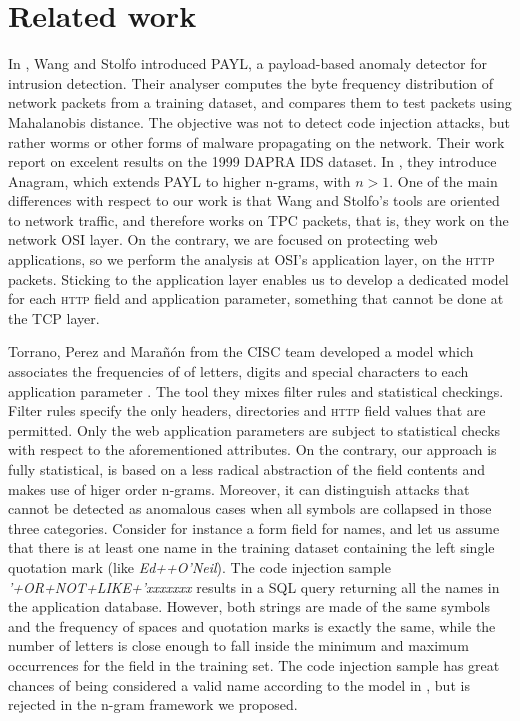 \documentclass[runningheads,a4paper]{llncs}
\newcommand{\HTTP}{\textsc{http}\xspace}
\begin{document}
\section{Related work}

In \cite{wang2004anomalous}, Wang and Stolfo introduced PAYL, a payload-based anomaly detector for intrusion detection. Their analyser computes the byte frequency distribution of network packets from a training dataset, and compares them to test packets using Mahalanobis distance. The objective was not to detect code injection attacks, but rather worms or other forms of malware propagating on the network. Their work report on excelent results on the 1999 DAPRA IDS dataset. In \cite{wang2006anagram}, they introduce Anagram, which extends PAYL to higher n-grams, with $n>1$. One of the main differences with respect to our work is that Wang and Stolfo's tools are oriented to network traffic, and therefore works on TPC packets, that is, they work on the network OSI layer. On the contrary, we are focused on protecting web applications, so we perform the analysis at OSI's application layer, on the \HTTP packets. Sticking to the application layer enables us to develop a dedicated model for each \HTTP field and application parameter, something that cannot be done at the TCP layer. 

Torrano, Perez and Marañón from the CISC team developed a model which associates the frequencies of of letters, digits and special characters to each application parameter \cite{torrano2010anomaly}. The tool they mixes filter rules and statistical checkings. Filter rules specify the only headers, directories and \HTTP field values that are permitted. Only the web application parameters are subject to statistical checks with respect to the aforementioned attributes. On the contrary, our approach is fully statistical, is based on a less radical abstraction of the field contents and makes use of higer order n-grams. Moreover, it can distinguish attacks that cannot be detected as anomalous cases when all symbols are collapsed in those three categories. Consider for instance a form field for names, and let us assume that there is at least one name in the training dataset containing the left single quotation mark (like \textit{Ed++O'Neil}). The code injection sample \textit{'+\textsc{OR+NOT+LIKE}+'xxxxxxx} results in a SQL query returning all the names in the application database. However, both strings are made of the same symbols and the frequency of spaces and quotation marks is exactly the same, while the number of letters is close enough to fall inside the minimum and maximum occurrences for the field in the training set. The code injection sample has great chances of being considered a valid name according to the model in \cite{torrano2010anomaly}, but is rejected in the n-gram framework we proposed.
\end{document}
